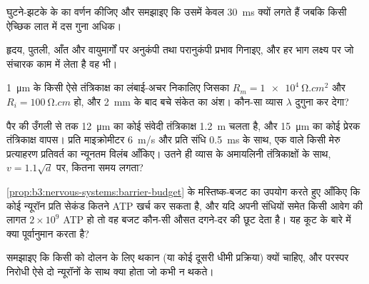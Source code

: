 \begin{exercise}[$\star$]\label{exo:b3:nervous-systems:3}
घुटने-झटके के  का वर्णन कीजिए और समझाइए कि उसमें केवल
\qty{30}{ms} क्यों लगते हैं जबकि किसी ऐच्छिक लात में दस गुना अधिक।
\end{exercise}

\begin{exercise}[$\star$]\label{exo:b3:nervous-systems:4}
हृदय, पुतली, आँत और वायुमार्गों पर अनुकंपी तथा परानुकंपी प्रभाव
गिनाइए, और हर भाग लक्ष्य पर जो संचारक काम में लेता है वह भी।
\end{exercise}

\begin{exercise}[$\star\star$]\label{exo:b3:nervous-systems:5}
\qty{1}{\micro m} के किसी ऐसे तंत्रिकाक्ष का लंबाई-अचर निकालिए जिसका $R_{m}
= \qty{1e4}{\ohm.cm^2}$ और $R_{i} = \qty{100}{\ohm.cm}$ हो, और
\qty{2}{mm} के बाद बचे संकेत का अंश। कौन-सा व्यास $\lambda$ दुगुना कर
देगा?
\end{exercise}

\begin{exercise}[$\star\star$]\label{exo:b3:nervous-systems:6}
पैर की उँगली से  तक \qty{12}{\micro m} का कोई संवेदी
तंत्रिकाक्ष \qty{1.2}{m} चलता है, और \qty{15}{\micro m} का कोई प्रेरक
तंत्रिकाक्ष वापस। प्रति माइक्रोमीटर \qty{6}{m/s} और प्रति संधि
\qty{0.5}{ms} के साथ, एक  वाले किसी मेरु प्रत्याहरण
प्रतिवर्त का न्यूनतम विलंब आँकिए। उतने ही व्यास के अमायलिनी
तंत्रिकाक्षों के साथ, $v = 1.1\sqrt{d}$ पर, कितना समय लगता?
\end{exercise}

\begin{exercise}[$\star\star$]\label{exo:b3:nervous-systems:7}
\cref{prop:b3:nervous-systems:barrier-budget} के मस्तिष्क-बजट का
उपयोग करते हुए आँकिए कि कोई न्यूरॉन प्रति सेकंड कितने ATP खर्च कर सकता
है, और यदि अपनी संधियों समेत किसी आवेग की लागत
$2\times 10^{9}$ ATP हो तो वह बजट कौन-सी औसत दगने-दर की छूट देता है। यह
कूट के बारे में क्या पूर्वानुमान करता है?
\end{exercise}

\begin{exercise}[$\star\star$]\label{exo:b3:nervous-systems:8}
समझाइए कि किसी  को दोलन के लिए थकान (या कोई दूसरी धीमी
प्रक्रिया) क्यों चाहिए, और परस्पर निरोधी ऐसे दो न्यूरॉनों के साथ क्या
होता जो कभी न थकते।
\end{exercise}

